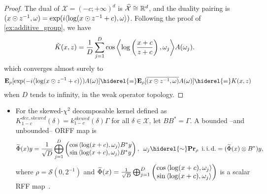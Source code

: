 \begin{proof}
The dual of $\mathcal{X}=(-c;+\infty)^d$
is $\dual{\mathcal{X}}\cong\mathbb{R}^d$, and the duality pairing is $\pairing{x \odot \myinv{z},\omega}=\exp(i\inner{\log(x\odot z^{-1}+c), \omega})$. Following the proof of \cref{ex:additive_group}, we have
\begin{equation*}
\begin{aligned}
\tilde{K}(x,z)&= \frac{1}{D} \sum_{j=1}^D \cos{\inner*{\log\left(\frac{x+c}{z+c}\right), \omega_j}}A(\omega_j).
\end{aligned}
\end{equation*}
which converges almost surely to
\begin{dmath*}
\expectation_{\rho}[\exp(-i\inner*{\log(x\odot z^{-1}+c)})A(\omega) ]\hiderel{=}\expectation_{\rho}[\conj{\pairing{x\odot z^{-1},\omega}}A(\omega)]\hiderel{=}K(x, z)
\end{dmath*}
when $D$ tends to infinity, in the weak operator topology.
\end{proof}
\begin{itemize}
\item For the skewed-$\chi^2$ decomposable kernel defined as $K_{1-c}^{dec,skewed}(\delta)=k_{1-c}^{skewed}(\delta)\Gamma$ for all $\delta\in\mathcal{X}$, let $BB^*=\Gamma$. A bounded --and unbounded-- \acs{ORFF} map is
\begin{dmath*}
\tildePhi{\omega}(x)y=\frac{1}{\sqrt{D}}\Vect_{j=1}^D\begin{pmatrix}\cos{\inner{\log(x+c),\omega_j}}B^\adjoint y\\ \sin{\inner{\log(x+c),\omega_j}}B^\adjoint y\end{pmatrix}, \enskip \omega_j \hiderel{\sim} \probability_{\rho} \enskip\text{\iid}
=(\tildePhi{\omega}(x) \otimes B^\adjoint)y,
\end{dmath*}
where $\rho=\mathcal{S}(0,2^{-1})$ and $\tildePhi{\omega}(x)=\frac{1}{\sqrt{D}}\Vect_{j=1}^D\begin{pmatrix}\cos{\inner{\log(x+c),\omega_j}} \\ \sin{\inner{\log(x+c),\omega_j}}\end{pmatrix}$ is a scalar \acs{RFF} map~\citep{li2010random}.
\end{itemize}
